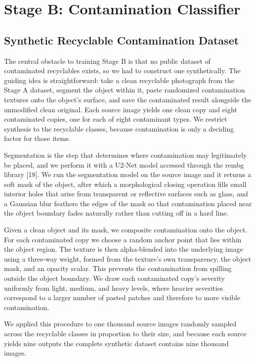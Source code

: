 \documentclass[10pt,twocolumn]{article}
\begin{document}
\section{Stage B: Contamination Classifier}
\subsection{Synthetic Recyclable Contamination Dataset}
The central obstacle to training Stage B is that no public dataset of contaminated recyclables exists, so we had to construct one synthetically. The guiding idea is straightforward: take a clean recyclable photograph from the Stage A dataset, segment the object within it, paste randomized contamination textures onto the object's surface, and save the contaminated result alongside the unmodified clean original. Each source image yields one clean copy and eight contaminated copies, one for each of eight contaminant types. We restrict synthesis to the recyclable classes, because contamination is only a deciding factor for those items.

Segmentation is the step that determines where contamination may legitimately be placed, and we perform it with a U2-Net model accessed through the rembg library [18]. We run the segmentation model on the source image and it returns a soft mask of the object, after which a morphological closing operation fills small interior holes that arise from transparent or reflective surfaces such as glass, and a Gaussian blur feathers the edges of the mask so that contamination placed near the object boundary fades naturally rather than cutting off in a hard line.

Given a clean object and its mask, we composite contamination onto the object. For each contaminated copy we choose a random anchor point that lies within the object region. The texture is then alpha-blended into the underlying image using a three-way weight, formed from the texture's own transparency, the object mask, and an opacity scalar. This prevents the contamination from spilling outside the object boundary. We draw each contaminated copy's severity uniformly from light, medium, and heavy levels, where heavier severities correspond to a larger number of pasted patches and therefore to more visible contamination.

We applied this procedure to one thousand source images randomly sampled across the recyclable classes in proportion to their size, and because each source yields nine outputs the complete synthetic dataset contains nine thousand images.
\end{document}
